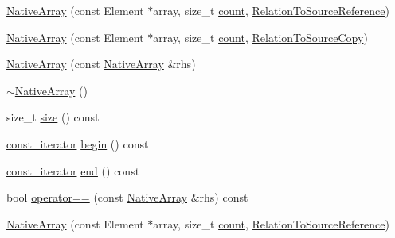 \begin{DoxyCompactItemize}
\mbox{\hyperlink{classtesting_1_1internal_1_1_native_array_a52b3689c62532703d11e9d82939a7141}{Native\+Array}} (const Element $\ast$array, size\+\_\+t \mbox{\hyperlink{_obj__test_2lib_2googletest-release-1_88_81_2googlemock_2test_2gmock__stress__test_8cc_afd9db40e3361ae09188795e8cbe19752}{count}}, \mbox{\hyperlink{structtesting_1_1internal_1_1_relation_to_source_reference}{Relation\+To\+Source\+Reference}})
\item 
\mbox{\hyperlink{classtesting_1_1internal_1_1_native_array_ac184ee5741af5be3402213819c834405}{Native\+Array}} (const Element $\ast$array, size\+\_\+t \mbox{\hyperlink{_obj__test_2lib_2googletest-release-1_88_81_2googlemock_2test_2gmock__stress__test_8cc_afd9db40e3361ae09188795e8cbe19752}{count}}, \mbox{\hyperlink{structtesting_1_1internal_1_1_relation_to_source_copy}{Relation\+To\+Source\+Copy}})
\item 
\mbox{\hyperlink{classtesting_1_1internal_1_1_native_array_abb346ac3040f5da733f594cc2d5958bc}{Native\+Array}} (const \mbox{\hyperlink{classtesting_1_1internal_1_1_native_array}{Native\+Array}} \&rhs)
\item 
\mbox{\hyperlink{classtesting_1_1internal_1_1_native_array_a55ab5948d473a487303dcf6e02ad1f60}{$\sim$\+Native\+Array}} ()
\item 
size\+\_\+t \mbox{\hyperlink{classtesting_1_1internal_1_1_native_array_af96a4a5ca0cdd5d163c47a081f08bd89}{size}} () const
\item 
\mbox{\hyperlink{classtesting_1_1internal_1_1_native_array_a9ce7c8408460d7158a2870456d134557}{const\+\_\+iterator}} \mbox{\hyperlink{classtesting_1_1internal_1_1_native_array_a3046d93cfa23097e7b7c91f5f982dc78}{begin}} () const
\item 
\mbox{\hyperlink{classtesting_1_1internal_1_1_native_array_a9ce7c8408460d7158a2870456d134557}{const\+\_\+iterator}} \mbox{\hyperlink{classtesting_1_1internal_1_1_native_array_ae1cda748e49c6906421c6183c4d07c5a}{end}} () const
\item 
bool \mbox{\hyperlink{classtesting_1_1internal_1_1_native_array_a81b90f5739ed812610e68dc34c9e3850}{operator==}} (const \mbox{\hyperlink{classtesting_1_1internal_1_1_native_array}{Native\+Array}} \&rhs) const
\item 
\mbox{\hyperlink{classtesting_1_1internal_1_1_native_array_a52b3689c62532703d11e9d82939a7141}{Native\+Array}} (const Element $\ast$array, size\+\_\+t \mbox{\hyperlink{_obj__test_2lib_2googletest-release-1_88_81_2googlemock_2test_2gmock__stress__test_8cc_afd9db40e3361ae09188795e8cbe19752}{count}}, \mbox{\hyperlink{structtesting_1_1internal_1_1_relation_to_source_reference}{Relation\+To\+Source\+Reference}})

\end{DoxyCompactItemize}
